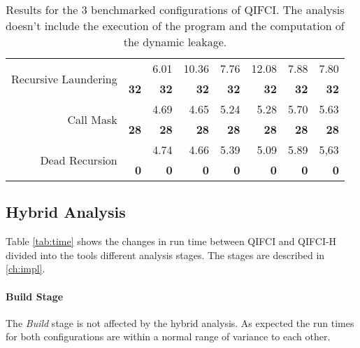 \begin{center}
\begin{table}[]
\begin{tabular}{rr|rrrrrr}
\multirow{2}{*}{Recursive Laundering} &              & 6.01         & \multicolumn{1}{r|}{10.36}        & 7.76         & \multicolumn{1}{r|}{12.08}        & 7.88              & 7.80             \\
                                      & \textbf{32}  & \textbf{32}  & \multicolumn{1}{r|}{\textbf{32}}  & \textbf{32}  & \multicolumn{1}{r|}{\textbf{32}}  & \textbf{32}       & \textbf{32}      \\ \hline
\multirow{2}{*}{Call Mask}            &              & 4.69         & \multicolumn{1}{r|}{4.65}         & 5.24         & \multicolumn{1}{r|}{5.28}         & 5.70              & 5.63             \\
                                      & \textbf{28}  & \textbf{28}  & \multicolumn{1}{r|}{\textbf{28}}  & \textbf{28}  & \multicolumn{1}{r|}{\textbf{28}}  & \textbf{28}       & \textbf{28}      \\ \hline
\multirow{2}{*}{Dead Recursion}       &              & 4.74         & \multicolumn{1}{r|}{4.66}         & 5.39         & \multicolumn{1}{r|}{5.09}         & 5.89              & 5,63             \\
                                      & \textbf{0}   & \textbf{0}   & \multicolumn{1}{r|}{\textbf{0}}   & \textbf{0}   & \multicolumn{1}{r|}{\textbf{0}}   & \textbf{0}        & \textbf{0}       \\  
\end{tabular}
\caption{Results for the 3 benchmarked configurations of QIFCI. The analysis doesn't include the execution of the program and the computation of the dynamic leakage.}\label{tab:qifcicc}
\end{table}
\end{center}

\subsection{Hybrid Analysis}
Table \ref{tab:time} shows the changes in run time between QIFCI and QIFCI-H divided into the tools different analysis stages. The stages are described in \ref{ch:impl}.

\paragraph{Build Stage}
The \emph{Build} stage is not affected by the hybrid analysis. As expected the run times for both configurations are within a normal range of variance to each other.

